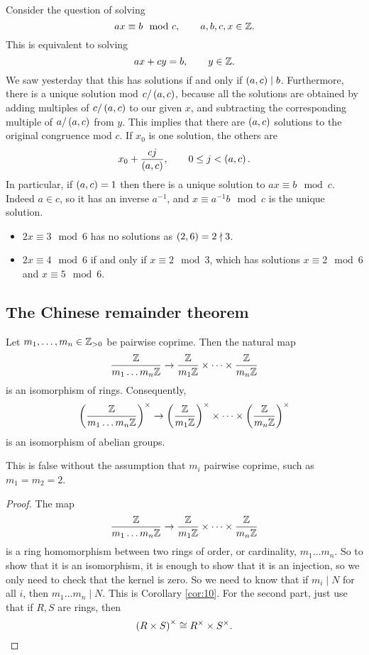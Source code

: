 Consider the question of solving
$$ ax \equiv b \mod c, \qquad a, b, c, x \in \mathbb{Z}. $$
This is equivalent to solving
$$ ax + cy = b, \qquad y \in \mathbb{Z}. $$
We saw yesterday that this has solutions if and only if $ \left( a, c \right) \mid b $. Furthermore, there is a unique solution mod $ c / \left( a, c \right) $, because all the solutions are obtained by adding multiples of $ c / \left( a, c \right) $ to our given $ x $, and subtracting the corresponding multiple of $ a / \left( a, c \right) $ from $ y $. This implies that there are $ \left( a, c \right) $ solutions to the original congruence mod $ c $. If $ x_0 $ is one solution, the others are
$$ x_0 + \dfrac{cj}{\left( a, c \right)}, \qquad 0 \le j < \left( a, c \right). $$
In particular, if $ \left( a, c \right) = 1 $ then there is a unique solution to $ ax \equiv b \mod c $. Indeed $ a \in \unit{c} $, so it has an inverse $ a^{-1} $, and $ x \equiv a^{-1}b \mod c $ is the unique solution.

\begin{example2}
\hfill
\begin{itemize}
\item $ 2x \equiv 3 \mod 6 $ has no solutions as $ \left( 2, 6 \right) = 2 \nmid 3 $.
\item $ 2x \equiv 4 \mod 6 $ if and only if $ x \equiv 2 \mod 3 $, which has solutions $ x \equiv 2 \mod 6 $ and $ x \equiv 5 \mod 6 $.
\end{itemize}
\end{example2}

\subsection{The Chinese remainder theorem}

\begin{theorem}
\label{thm:14}
Let $ m_1, \dots, m_n \in \mathbb{Z}_{> 0} $ be pairwise coprime. Then the natural map
$$ \dfrac{\mathbb{Z}}{m_1 \dots m_n\mathbb{Z}} \to \dfrac{\mathbb{Z}}{m_1\mathbb{Z}} \times \dots \times \dfrac{\mathbb{Z}}{m_n\mathbb{Z}} $$
is an isomorphism of rings. Consequently,
$$ \left( \dfrac{\mathbb{Z}}{m_1 \dots m_n\mathbb{Z}} \right)^\times \to \left( \dfrac{\mathbb{Z}}{m_1\mathbb{Z}} \right)^\times \times \dots \times \left( \dfrac{\mathbb{Z}}{m_n\mathbb{Z}} \right)^\times $$
is an isomorphism of abelian groups.
\end{theorem}

\begin{remark2}
This is false without the assumption that $ m_i $ pairwise coprime, such as $ m_1 = m_2 = 2 $.
\end{remark2}

\begin{proof}
The map
$$ \dfrac{\mathbb{Z}}{m_1 \dots m_n\mathbb{Z}} \to \dfrac{\mathbb{Z}}{m_1\mathbb{Z}} \times \dots \times \dfrac{\mathbb{Z}}{m_n\mathbb{Z}} $$
is a ring homomorphism between two rings of order, or cardinality, $ m_1 \dots m_n $. So to show that it is an isomorphism, it is enough to show that it is an injection, so we only need to check that the kernel is zero. So we need to know that if $ m_i \mid N $ for all $ i $, then $ m_1 \dots m_n \mid N $. This is Corollary \ref{cor:10}. For the second part, just use that if $ R, S $ are rings, then
$$ \left( R \times S \right)^\times \cong R^\times \times S^\times. $$
\end{proof}

